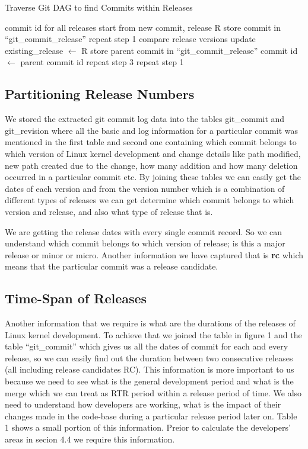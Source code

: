 \documentclass{acm_proc_article-sp}
\begin{document}
\begin{algorithm}
\caption{Traverse Git DAG to find Commits within Releases}
\begin{algorithmic}[1]
\REQUIRE
\STATE commit id for all releases
\ENSURE
{}
\STATE start from new commit, release R
\STATE store commit in ``git\_commit\_release''
			\STATE repeat step 1
			\STATE compare release versions
				\STATE update existing\_release $\gets$ R
			\ENDIF
		\ELSE
			\STATE store parent commit in ``git\_commit\_release''
			\STATE commit id $\gets$ parent commit id
			\STATE repeat step 3
		\ENDIF
	\ENDFOR
{}
	\STATE repeat step 1
\ENDIF
\ENDFOR
\end{algorithmic}
\end{algorithm}

 \subsection{Partitioning Release Numbers}
We stored the extracted git commit log data into the tables git\_commit and git\_revision where all the basic and log information for a particular commit was mentioned in the first table and second one containing which commit belongs to which version of Linux kernel development and change details like path modified, new path created due to the change, how many addition and how many deletion occurred in a particular commit etc. By joining these tables we can easily get the dates of each version and from the version number which is a combination of different types of releases we can get determine which commit belongs to which version and release, and also what type of release that is.

We are getting the release dates with every single commit record. So we can understand which commit belongs to which version of release; is this a major release or minor or micro. Another information we have captured that is \textbf{rc} which means that the particular commit was a release candidate.

\subsection{Time-Span of Releases}
Another information that we require is what are the durations of the releases of Linux kernel development. To achieve that we joined the table in figure 1 and the table ``git\_commit'' which gives us all the dates of commit for each and every release, so we can easily find out the duration between two consecutive releases (all including release candidates RC). This information is more important to us because we need to see what is the general development period and what is the merge which we can treat as RTR period within a release period of time. We also need to understand how developers are working, what is the impact of their changes made in the code-base during a particular release period later on. Table 1 shows a small portion of this information. Preior to calculate the developers' areas in secion 4.4 we require this information.
\end{document}
